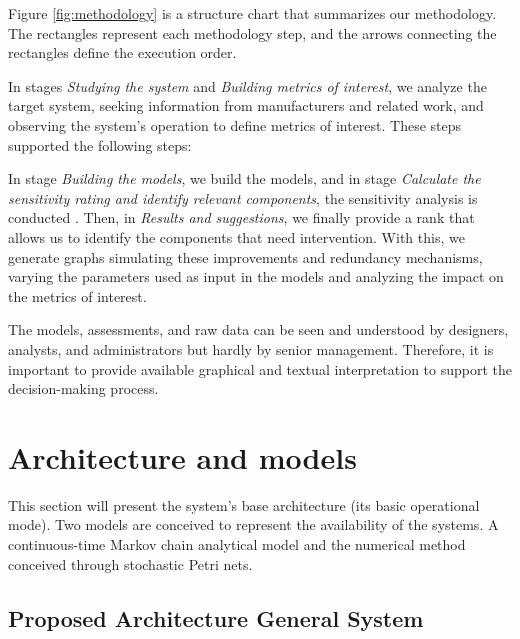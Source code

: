 \documentclass[conference]{IEEEtran}
\begin{document}
Figure \ref{fig:methodology} is a structure chart that summarizes our methodology. The rectangles represent each methodology step, and the arrows connecting the rectangles define the execution order.

In stages \textit{Studying the system} and \textit{Building metrics of interest}, we analyze the target system, seeking information from manufacturers and related work, and observing the system's operation to define metrics of interest. These steps supported the following steps:

In stage \textit{Building the models}, we build the models, and in stage \textit{Calculate the sensitivity rating and identify relevant components}, the sensitivity analysis is conducted \citep{maciel2017mercury, matos2020bottleneck, de2014redundant}. Then, in \textit{Results and suggestions}, we finally provide a rank that allows us to identify the components that need intervention. With this, we generate graphs simulating these improvements and redundancy mechanisms, varying the parameters used as input in the models and analyzing the impact on the metrics of interest. 

The models, assessments, and raw data can be seen and understood by designers, analysts, and administrators but hardly by senior management. Therefore, it is important to provide available graphical and textual interpretation to support the decision-making process\citep{melo2021distributed}. 


\section{Architecture and models}\label{sec:model}

This section will present the system's base architecture (its basic operational mode). Two models are conceived to represent the availability of the systems. A continuous-time Markov chain analytical model and the numerical method conceived through stochastic Petri nets.

\subsection{Proposed Architecture General System}
\end{document}
